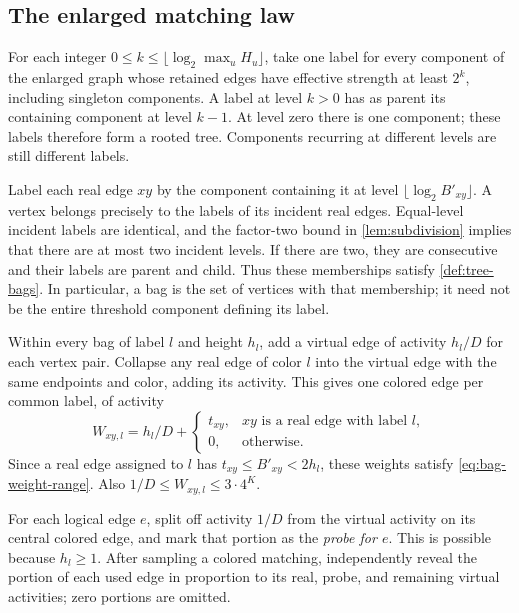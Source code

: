 \documentclass[11pt]{article}
\theoremstyle{definition}
\theoremstyle{remark}
\numberwithin{equation}{section}
\begin{document}
\subsection{The enlarged matching law}

For each integer $0\le k\le\lfloor\log_2\max_uH_u\rfloor$, take
one label for every component of the enlarged graph whose retained
edges have effective strength at least $2^k$, including singleton
components. A label at level $k>0$ has as parent its containing
component at level $k-1$. At level zero there is one component;
these labels therefore form a rooted tree. Components recurring at
different levels are still different labels.

Label each real edge $xy$ by the component containing it at level
$\lfloor\log_2B'_{xy}\rfloor$. A vertex belongs precisely to the
labels of its incident real edges. Equal-level incident labels are
identical, and the factor-two bound in \cref{lem:subdivision} implies
that there are at most two incident levels. If there are two, they
are consecutive and their labels are parent and child. Thus these
memberships satisfy \cref{def:tree-bags}. In particular, a bag is
the set of vertices with that membership; it need not be the entire
threshold component defining its label.

Within every bag of label $l$ and height $h_l$, add a virtual edge
of activity $h_l/D$ for each vertex pair. Collapse any real edge
of color $l$ into the virtual edge with the same endpoints and
color, adding its activity. This gives one colored edge per common
label, of activity
\[
 W_{xy,l}=h_l/D+
 \begin{cases}
 t_{xy},&xy\text{ is a real edge with label }l,\\
 0,&\text{otherwise}.
 \end{cases}
\]
Since a real edge assigned to $l$ has
$t_{xy}\le B'_{xy}<2h_l$, these weights satisfy
\cref{eq:bag-weight-range}. Also
$1/D\le W_{xy,l}\le3\cdot4^K$.

For each logical edge $e$, split off activity $1/D$ from the
virtual activity on its central colored edge, and mark that portion
as the \emph{probe for $e$}. This is possible because $h_l\ge1$.
After sampling a colored matching, independently reveal the portion
of each used edge in proportion to its real, probe, and remaining
virtual activities; zero portions are omitted.
\end{document}
